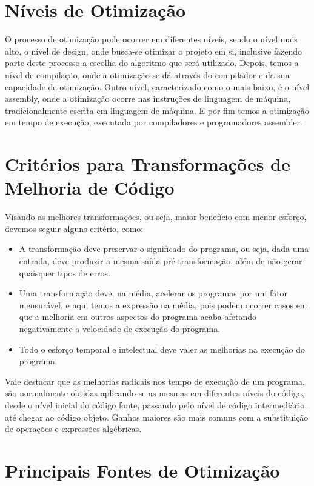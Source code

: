 \documentclass[12pt]{article}
\begin{document}
\section{Níveis de Otimização}

O processo de otimização pode ocorrer em diferentes níveis, sendo o nível mais alto, o nível de design, onde busca-se otimizar o projeto em si, inclusive fazendo parte deste processo a escolha do algoritmo que será utilizado. Depois, temos a nível de compilação, onde a otimização se dá através do compilador e da sua capacidade de otimização.
Outro nível, caracterizado como o mais baixo, é o nível assembly, onde a otimização ocorre nas instruções de linguagem de máquina, tradicionalmente escrita em linguagem de máquina.
E por fim temos a otimização em tempo de execução, executada por compiladores e programadores assembler.

\section{Critérios para Transformações de Melhoria de Código}

Visando as melhores transformações, ou seja, maior benefício com menor esforço, devemos seguir alguns critério, como:
\begin{itemize}
    \item A transformação deve preservar o significado do programa, ou seja, dada uma entrada, deve produzir a mesma saída pré-transformação, além de não gerar quaisquer tipos de erros.
    \item Uma transformação deve, na média, acelerar os programas por um fator mensurável, e aqui temos a expressão na média, pois podem ocorrer casos em que a melhoria em outros aspectos do programa acaba afetando negativamente a velocidade de execução do programa.
    \item Todo o esforço temporal e intelectual deve valer as melhorias na execução do programa.
\end{itemize}

Vale destacar que as melhorias radicais nos tempo de execução de um programa, são normalmente obtidas aplicando-se as mesmas em diferentes níveis do código, desde o nível inicial do código fonte, passando pelo nível de código intermediário, até chegar ao código objeto. Ganhos maiores são mais comuns com a substituição de operações e expressões algébricas.\cite{lam2007compiladores}

\section{Principais Fontes de Otimização}
\end{document}
